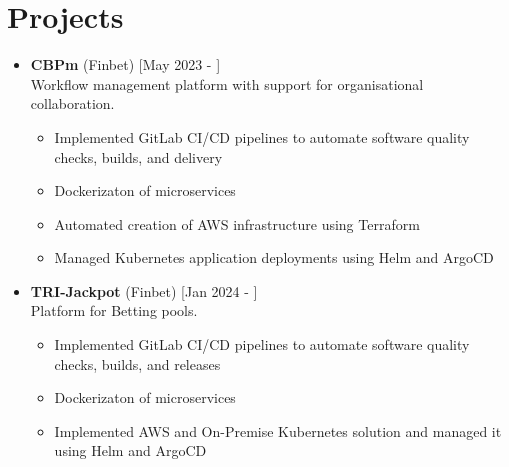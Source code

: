 \documentclass[a4paper]{moderncv}
\begin{document}
\section{Projects}	

		\begin{itemize}
			\item \textbf{CBPm} (Finbet) \hfill[May 2023 - ]\\
			Workflow management platform with support for organisational collaboration. \\
			\begin{itemize}
				\vspace{-1.5em}
				\setlength\itemsep{0.1em}
				\item Implemented GitLab CI/CD pipelines to automate software quality checks, builds, and delivery
				\item Dockerizaton of microservices
				\item Automated creation of AWS infrastructure using Terraform
				\item Managed Kubernetes application deployments using Helm and ArgoCD
			\end{itemize}
			
			\item \textbf{TRI-Jackpot} (Finbet) \hfill[Jan 2024 - ]\\
			Platform for Betting pools. \\
			\begin{itemize}
				\vspace{-1.5em}
				\setlength\itemsep{0.1em}
				\item Implemented GitLab CI/CD pipelines to automate software quality checks, builds, and releases
				\item Dockerizaton of microservices
				\item Implemented AWS and On-Premise Kubernetes solution and managed it using Helm and ArgoCD
			\end{itemize}

			

\end{itemize}
\end{document}
